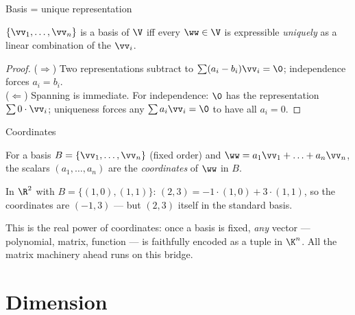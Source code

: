 \begin{frame}{Basis = unique representation}
\begin{theorem}
$\{\vv_1,\ldots,\vv_n\}$ is a basis of $\V$ iff every $\ww\in\V$ is expressible \emph{uniquely} as a linear
combination of the $\vv_i$.
\end{theorem}

\pause

\begin{proof}
($\Rightarrow$) Two representations subtract to $\sum(a_i-b_i)\vv_i=\0$; independence forces $a_i=b_i$.\\
($\Leftarrow$) Spanning is immediate. For independence: $\0$ has the representation $\sum 0\cdot\vv_i$;
uniqueness forces any $\sum a_i\vv_i=\0$ to have all $a_i=0$.
\end{proof}
\end{frame}

\begin{frame}{Coordinates}
\begin{definition}
For a basis $B=\{\vv_1,\ldots,\vv_n\}$ (fixed order) and $\ww=a_1\vv_1+\ldots+a_n\vv_n$, the scalars
$(a_1,\ldots,a_n)$ are the \emph{coordinates} of $\ww$ in $B$.
\end{definition}

\pause

\begin{example}
In $\R^2$ with $B=\{(1,0),(1,1)\}$: $(2,3)=-1\cdot(1,0)+3\cdot(1,1)$, so the coordinates are $(-1,3)$ — but
$(2,3)$ itself in the standard basis.
\end{example}

\pause

\begin{remark}
This is the real power of coordinates: once a basis is fixed, \emph{any} vector — polynomial, matrix,
function — is faithfully encoded as a tuple in $\K^n$. All the matrix machinery ahead runs on this bridge.
\end{remark}
\end{frame}

\section{Dimension}

